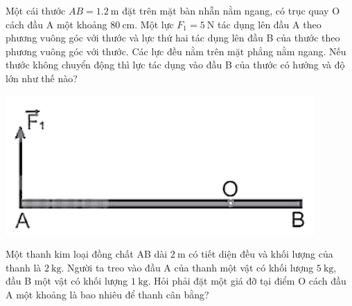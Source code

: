 \begin{ex}
	Một cái thước $AB=\SI{1.2}{\meter}$ đặt trên mặt bàn nhẵn nằm ngang, có trục quay O cách đầu A một khoảng $\SI{80}{\centi\meter}$. Một lực $F_1=\SI{5}{\newton}$ tác dụng lên đầu A theo phương vuông góc với thước và lực thứ hai tác dụng lên đầu B của thước theo phương vuông góc với thước. Các lực đều nằm trên mặt phẳng nằm ngang. Nếu thước không chuyển động thì lực tác dụng vào đầu B của thước có hướng và độ lớn như thế nào?
	\begin{center}
		\includegraphics[width=0.35\linewidth]{../figs/VN10-2022-PH-TP023-P-8}
	\end{center}
\end{ex}
\begin{ex}
	Một thanh kim loại đồng chất AB dài $\SI{2}{\meter}$ có tiết diện đều và khối lượng của thanh là $\SI{2}{\kilo\gram}$. Người ta treo vào đầu A của thanh một vật có khối lượng $\SI{5}{\kilogram}$, đầu B một vật có khối lượng $\SI{1}{\kilogram}$. Hỏi phải đặt một giá đỡ tại điểm O cách đầu A một khoảng là bao nhiêu để thanh cân bằng?
\end{ex}

